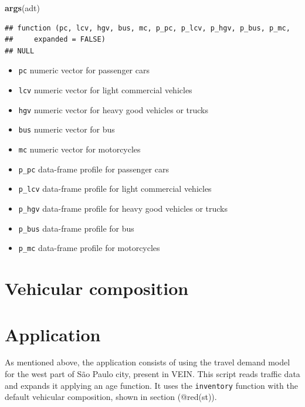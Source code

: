 \documentclass[12pt,graybox,envcountchap,sectrefs]{krantz}
\makeatletter
\newenvironment{Shaded}{\begin{snugshade}}{\end{snugshade}}
\newcommand{\KeywordTok}[1]{\textcolor[rgb]{0.13,0.29,0.53}{\textbf{#1}}}
\newcommand{\NormalTok}[1]{#1}
\providecommand{\tightlist}{%
  \setlength{\itemsep}{0pt}\setlength{\parskip}{0pt}}
\newenvironment{kframe}{%
\medskip{}
\setlength{\fboxsep}{.8em}
 \def\at@end@of@kframe{}%
 \ifinner\ifhmode%
  \def\at@end@of@kframe{\end{minipage}}%
  \begin{minipage}{\columnwidth}%
 \fi\fi%
 \def\FrameCommand##1{\hskip\@totalleftmargin \hskip-\fboxsep
 \colorbox{shadecolor}{##1}\hskip-\fboxsep
     \hskip-\linewidth \hskip-\@totalleftmargin \hskip\columnwidth}%
 \MakeFramed {\advance\hsize-\width
   \@totalleftmargin\z@ \linewidth\hsize
   \@setminipage}}%
 {\par\unskip\endMakeFramed%
 \at@end@of@kframe}
\renewenvironment{Shaded}{\begin{kframe}}{\end{kframe}}
\theoremstyle{definition}
\theoremstyle{definition}
\theoremstyle{definition}
\theoremstyle{remark}
\makeatother
\begin{document}
\begin{Shaded}
\begin{Highlighting}[]
\KeywordTok{args}\NormalTok{(adt)}
\end{Highlighting}
\end{Shaded}

\begin{verbatim}
## function (pc, lcv, hgv, bus, mc, p_pc, p_lcv, p_hgv, p_bus, p_mc, 
##     expanded = FALSE) 
## NULL
\end{verbatim}

\begin{itemize}
\tightlist
\item
  \texttt{pc} numeric vector for passenger cars
\item
  \texttt{lcv} numeric vector for light commercial vehicles
\item
  \texttt{hgv} numeric vector for heavy good vehicles or trucks
\item
  \texttt{bus} numeric vector for bus
\item
  \texttt{mc} numeric vector for motorcycles
\item
  \texttt{p\_pc} data-frame profile for passenger cars
\item
  \texttt{p\_lcv} data-frame profile for light commercial vehicles
\item
  \texttt{p\_hgv} data-frame profile for heavy good vehicles or trucks
\item
  \texttt{p\_bus} data-frame profile for bus
\item
  \texttt{p\_mc} data-frame profile for motorcycles
\end{itemize}

\section{Vehicular composition}\label{vehicular-composition}

\section{Application}\label{application}

As mentioned above, the application consists of using the travel demand
model for the west part of São Paulo city, present in VEIN. This script
reads traffic data and expands it applying an age function. It uses the
\texttt{inventory} function with the default vehicular composition,
shown in section (@red(st)).
\end{document}
